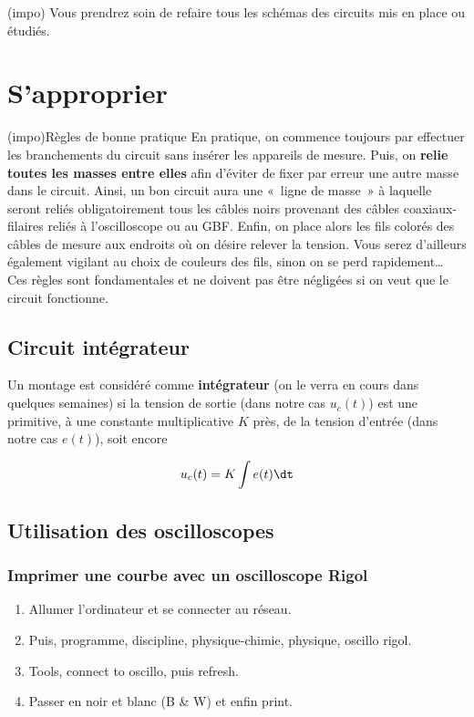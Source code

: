 \documentclass[../main/main.tex]{subfiles}
\begin{document}
\begin{tcb}[cnt](impo){}
	Vous prendrez soin de refaire tous les schémas des circuits mis en place ou
	étudiés.
\end{tcb}

\section{S'approprier}

\begin{tcb}(impo){Règles de bonne pratique}
	En pratique, on commence toujours par effectuer les branchements du circuit sans
	insérer les appareils de mesure. Puis, on \textbf{relie toutes les masses entre
		elles} afin d'éviter de fixer par erreur une autre masse dans le circuit. Ainsi,
	un bon circuit aura une «~ligne de masse~» à laquelle seront reliés
	obligatoirement tous les câbles noirs provenant des câbles coaxiaux-filaires
	reliés à l'oscilloscope ou au GBF. Enfin, on place alors les fils colorés des
	câbles de mesure aux endroits où on désire relever la tension. Vous serez
	d'ailleurs également vigilant au choix de couleurs des fils, sinon on se perd
	rapidement… Ces règles sont fondamentales et ne doivent pas être négligées si on
	veut que le circuit fonctionne.
\end{tcb}

\subsection{Circuit intégrateur}

Un montage est considéré comme \textbf{intégrateur} (on le verra en cours dans
quelques semaines) si la tension de sortie (dans notre cas $u_{c}(t)$) est une
primitive, à une constante multiplicative $K$ près, de la tension d'entrée (dans
notre cas $e(t)$), soit encore

\[u_{c}(t) = K \int e(t) \dt\]

\subsection{Utilisation des oscilloscopes}

\subsubsection{Imprimer une courbe avec un oscilloscope Rigol}

\begin{enumerate}
	\item Allumer l'ordinateur et se connecter au réseau.
	\item Puis, programme, discipline, physique-chimie, physique, oscillo rigol.
	\item Tools, connect to oscillo, puis refresh.
	\item Passer en noir et blanc (B \& W) et enfin print.
\end{enumerate}
\end{document}
